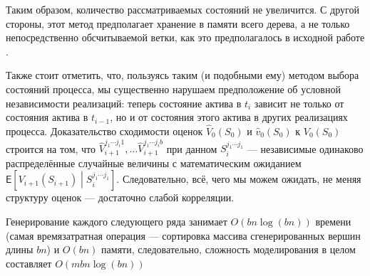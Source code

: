 \documentclass[specialist,
               substylefile = spbu.rtx,
               subf,href,colorlinks=true, 12pt]{disser}
\newcommand{\ev}{\mathsf{E}}
\begin{document}
		\par Таким образом, количество рассматриваемых состояний не увеличится. С другой стороны, этот метод предполагает хранение в памяти всего дерева, а не только непосредственно обсчитываемой ветки, как это предполагалось в исходной работе \cite{Broadie1997}.
		\par Также стоит отметить, что, пользуясь таким (и подобными ему) методом выбора состояний процесса, мы существенно нарушаем предположение об условной независимости реализаций: теперь состояние актива в $t_i$ зависит не только от состояния актива в $t_{i-1}$, но и от состояния этого актива в других реализациях процесса. Доказательство сходимости оценок $\hat{V}_0(S_0)$ и $\hat{v}_0(S_0)$ к $V_0(S_0)$ строится на том, что $\hat{V}_{i+1}^{j_1\cdots j_i 1}, \ldots \hat{V}_{i+1}^{j_1\cdots j_i b}$ при данном $S_i^{j_1\cdots j_1}$ --- независимые одинаково распределённые случайные величины с математическим ожиданием $\ev\left[V_{i+1}\left(S_{i+1}\right)\middle\vert S_i^{j_1\cdots j_1}\right]$. Следовательно, всё, чего мы можем ожидать, не меняя структуру оценок --- достаточно слабой корреляции.
		\par Генерирование каждого следующего ряда занимает $O\left(bn\log\left(bn\right)\right)$ времени (самая времязатратная операция --- сортировка массива сгенерированных вершин длины $bn$) и $O\left(bn\right)$ памяти, следовательно, сложность моделирования в целом составляет $O\left(mbn\log\left(bn\right)\right)$
\end{document}
